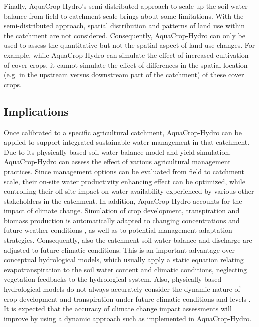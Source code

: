 Finally, AquaCrop-Hydro's semi-distributed approach to scale up the soil water balance from field to catchment scale brings about some limitations. With the semi-distributed approach, spatial distribution and patterns of land use within the catchment are not considered. Consequently, AquaCrop-Hydro can only be used to assess the quantitative but not the spatial aspect of land use changes. For example, while AquaCrop-Hydro can simulate the effect of increased cultivation of cover crops, it cannot simulate the effect of differences in the spatial location (e.g. in the upstream versus downstream part of the catchment) of these cover crops.

\subsection{Implications}
Once calibrated to a specific agricultural catchment, AquaCrop-Hydro can be applied to support integrated sustainable water management in that catchment. Due to its physically based soil water balance model and yield simulation, AquaCrop-Hydro can assess the effect of various agricultural management practices. Since management options can be evaluated from field to catchment scale, their on-site water productivity enhancing effect can be optimized, while controlling their off-site impact on water availability experienced by various other stakeholders in the catchment.  In addition, AquaCrop-Hydro accounts for the impact of climate change. Simulation of crop development, transpiration and biomass production is automatically adapted to changing \COtwo concentrations and future weather conditions \parencite{vanuytrecht2011}, as well as to potential management adaptation strategies. Consequently, also the catchment soil water balance and discharge are adjusted to future climatic conditions. This is an important advantage over conceptual hydrological models, which usually apply a static equation relating evapotranspiration to the soil water content and climatic conditions, neglecting vegetation feedbacks to the hydrological system. Also, physically based hydrological models do not always accurately consider the dynamic nature of crop development and transpiration under future climatic conditions and \COtwo levels \parencite{gassman2007, vanwalsum2012}. It is expected that the accuracy of climate change impact assessments will improve by using a dynamic approach such as implemented in AquaCrop-Hydro.

